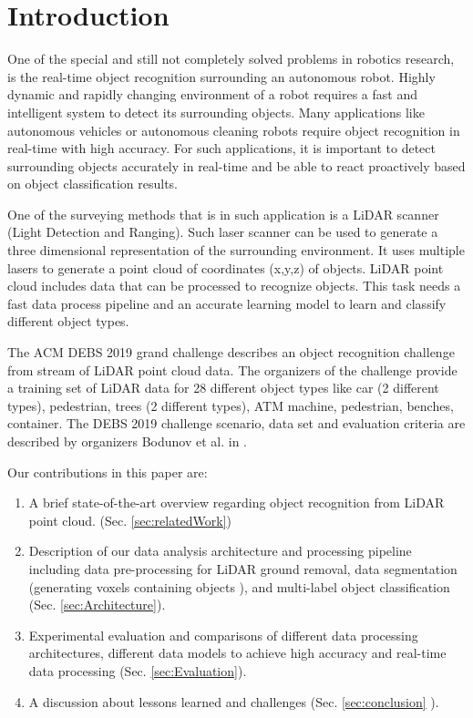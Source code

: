 \documentclass[sigconf]{acmart}
\begin{document}
\section{Introduction}
One of the special and still not completely solved problems in robotics research, is the real-time object recognition surrounding an autonomous robot. Highly dynamic and rapidly changing environment of a robot requires a fast and intelligent system to detect its surrounding objects. Many applications like autonomous vehicles or autonomous cleaning robots require object recognition in real-time with high accuracy. 
For such applications, it is important to detect surrounding objects accurately in real-time and be able to react proactively based on object classification results. 

One of the surveying methods that is in such application is a LiDAR scanner (Light Detection and Ranging). Such laser scanner can be used to generate a three dimensional representation of the surrounding environment. 
It uses multiple lasers to generate a point cloud of coordinates (x,y,z) of objects. 
LiDAR point cloud includes data that can be processed to recognize objects. This task needs a fast data process pipeline and an accurate learning model to learn and classify different object types. 

The ACM DEBS 2019 grand challenge \cite{DEBSGC2019} describes an object recognition challenge from stream of LiDAR point cloud data. 
The organizers of the challenge provide a training set of LiDAR data for 28 different object types like car (2 different types), pedestrian, trees (2 different types), ATM machine, pedestrian, benches, container. The DEBS 2019 challenge scenario, data set and evaluation criteria are described by  organizers Bodunov et al. in \cite{DEBSGC2019}. 


Our contributions in this paper are: 


\begin{enumerate}
  \item A brief state-of-the-art overview regarding object recognition from LiDAR point cloud.  (Sec. \ref{sec:relatedWork})
  \item Description of our data analysis architecture and processing pipeline including data pre-processing for LiDAR ground removal, data segmentation (generating voxels containing objects ), and multi-label object classification  (Sec.  \ref{sec:Architecture}).
  \item Experimental evaluation and comparisons of different data processing architectures, different data models to achieve high accuracy 
  and real-time data processing (Sec. \ref{sec:Evaluation}).  
  \item A discussion about lessons learned and challenges (Sec. \ref{sec:conclusion} ). 
\end{enumerate}    
\end{document}

